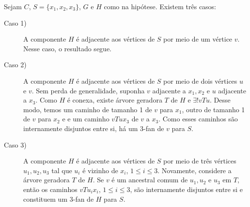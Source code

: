 
Sejam $C$, $S = \{x_1, x_2, x_3\}$, $G$ e $H$ como na hipótese. Existem três
casos:
\begin{description}
    \item[Caso 1)] A componente $H$ é adjacente aos vértices de $S$ por meio de
    um vértice $v$. Nesse caso, o resultado segue.

    \item[Caso 2)] A componente $H$ é adjacente aos vértices de $S$ por meio de
    dois vértices $u$ e $v$. Sem perda de generalidade, suponha $v$ adjacente a
    $x_1, x_2$ e $u$ adjacente a $x_3$. Como $H$ é conexa, existe árvore
    geradora $T$ de $H$ e $\exists!vTu$. Desse modo, temos um caminho de
    tamanho 1 de $v$ para $x_1$, outro de tamanho 1 de $v$ para $x_2$ e e um
    caminho $vTux_3$ de $v$ a $x_3$. Como esses caminhos são internamente
    disjuntos entre si, há um 3-fan de $v$ para $S$.

    \item[Caso 3)] A componente $H$ é adjacente aos vértices de $S$ por meio de
    três vértices $u_1, u_2, u_3$ tal que $u_i$ é vizinho de $x_i$, $1 \le i
    \le 3$. Novamente, considere a árvore geradora $T$ de $H$. Se $v$ é um
    ancestral comum de $u_1, u_2$ e $u_3$ em $T$, então os caminhos $vTu_ix_i$,
    $1 \le i \le 3$, são internamente disjuntos entre si e constituem um 3-fan
    de $H$ para $S$.
\end{description}
\fimprova


